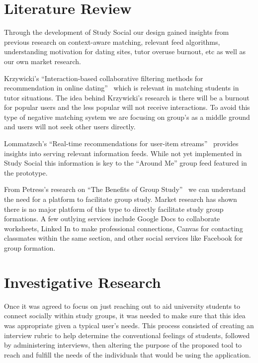 \documentclass{sigchi-ext}
\begin{document}
\section{Literature Review}
Through the development of Study Social our design gained insights from
previous research on context-aware matching, relevant feed algorithms,
understanding motivation for dating sites, tutor overuse burnout, etc as well
as our own market research.

Krzywicki's ``Interaction-based collaborative filtering methods for
recommendation in online dating''~\cite{krzywicki2010interaction} which is
relevant in matching students in tutor situations. The idea behind
Krzywicki's research is there will be a burnout for popular users and the
less popular will not receive interactions.  To avoid this type of negative
matching system we are focusing on group's as a middle ground and users will
not seek other users directly.

Lommatzsch's ``Real-time recommendations for user-item
streams''~\cite{lommatzsch2015real} provides insights into serving relevant
information feeds. While not yet implemented in Study Social this information
is key to the ``Around Me'' group feed featured in the prototype.

From Petress's research on ``The Benefits of Group
Study''~\cite{petress2004benefits} we can understand the need for a platform
to facilitate group study. Market research has shown there is no major
platform of this type to directly facilitate study group formations. A few
outlying services include Google Docs to collaborate worksheets, Linked In to
make professional connections, Canvas for contacting classmates within the
same section, and other social services like Facebook for group formation.



\section{Investigative Research}
Once it was agreed to focus on just reaching out to aid university students
to connect socially within study groups, it was needed to make sure that
this idea was appropriate given a typical user's needs. This process
consisted of creating an interview rubric to help determine the
conventional feelings of students, followed by administering interviews,
then altering the purpose of the proposed tool to reach and fulfill the
needs of the individuals that would be using the application.
\end{document}

